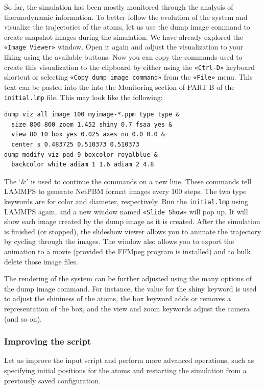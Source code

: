 \documentclass[9pt,tutorial]{livecoms}
\newcommand{\lmpcmd}[1]{\hspace{0pt}\colorbox{listing}{\textcolor{command}{\small{#1}}}\hspace{0pt}} %
\newcommand{\flecmd}[1]{\textcolor{command}{\texttt{#1}}} %
\newcommand{\guicmd}[1]{\textcolor{command}{\texttt{«#1»}}} %
\begin{document}
So far, the simulation has been mostly monitored through the analysis of
thermodynamic information.  To better follow the evolution of the system
and visualize the trajectories of the atoms, let us use the \lmpcmd{dump
  image} command to create snapshot images during the simulation.  We
have already explored the \guicmd{Image Viewer} window.  Open it again
and adjust the visualization to your liking using the available buttons.
Now you can copy the commands used to create this visualization to the
clipboard by either using the \guicmd{Ctrl-D} keyboard shortcut or
selecting \guicmd{Copy dump image command} from the \guicmd{File} menu.
This text can be pasted into the into the \lmpcmd{Monitoring} section
of \lmpcmd{PART B} of the \flecmd{initial.lmp} file.  This may look like
the following:
\begin{lstlisting}
dump viz all image 100 myimage-*.ppm type type &
  size 800 800 zoom 1.452 shiny 0.7 fsaa yes &
  view 80 10 box yes 0.025 axes no 0.0 0.0 &
  center s 0.483725 0.510373 0.510373
dump_modify viz pad 9 boxcolor royalblue &
  backcolor white adiam 1 1.6 adiam 2 4.8
\end{lstlisting}
{\color{blue}The `$\&$' is used to continue the commands on a new line.
These commands tell} LAMMPS to generate NetPBM format images every 100
steps.  The two \lmpcmd{type} keywords are for \lmpcmd{color} and
\lmpcmd{diameter}, respectively.  Run the \flecmd{initial.lmp} using
LAMMPS again, and a new window named \guicmd{Slide Show} will pop up.
It will show each image created by the \lmpcmd{dump image} as it is
created. After the simulation is finished (or stopped), the slideshow
viewer allows you to animate the trajectory by cycling through the
images.  The window also allows you to export the animation to a movie
(provided the FFMpeg program is installed) and to bulk delete those
image files.

The rendering of the system can be further adjusted using the many
options of the \lmpcmd{dump image} command.  For instance, the value for the
\lmpcmd{shiny} keyword is used to adjust the shininess of the atoms, the
\lmpcmd{box} keyword adds or removes a representation of the box, and
the \lmpcmd{view} and \lmpcmd{zoom} keywords adjust the camera (and so
on).

\subsubsection{Improving the script}

Let us improve the input script and perform more advanced operations,
such as specifying initial positions for the atoms and restarting the
simulation from a previously saved configuration.
\end{document}
